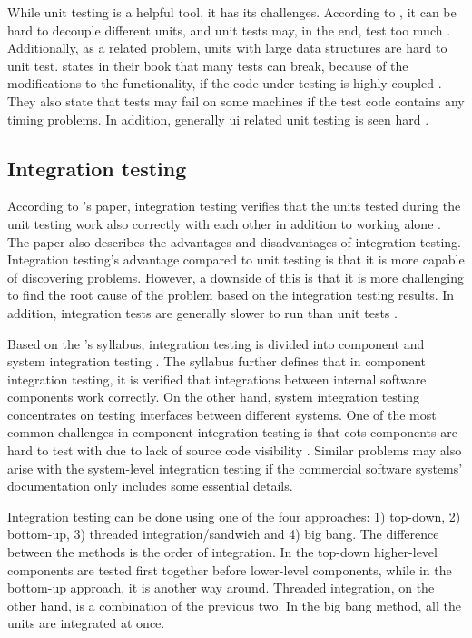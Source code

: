 While unit testing is a helpful tool, it has its challenges. According to \citeauthor{runeson2006survey}, it can be hard to decouple different units, and unit tests may, in the end, test too much \cite{runeson2006survey}. Additionally, as a related problem, units with large data structures are hard to unit test. \citeauthor{hunt2003pragmatic} states in their book that many tests can break, because of the modifications to the functionality, if the code under testing is highly coupled \cite{hunt2003pragmatic}. They also state that tests may fail on some machines if the test code contains any timing problems. In addition, generally \gls{ui} related unit testing is seen hard \cite{runeson2006survey}.

\subsection{Integration testing}\label{subsection:integration_testing}
According to \citeauthor{brar2015international}'s paper, integration testing verifies that the units tested during the unit testing work also correctly with each other in addition to working alone \cite{brar2015international}. The paper also describes the advantages and disadvantages of integration testing. Integration testing's advantage compared to unit testing is that it is more capable of discovering problems. However, a downside of this is that it is more challenging to find the root cause of the problem based on the integration testing results. In addition, integration tests are generally slower to run than unit tests \cite{simon2014mastering}.

Based on the \citeauthor{olsen2018istqbFoundation}'s syllabus, integration testing is divided into component and system integration testing \cite{olsen2018istqbFoundation}. The syllabus further defines that in component integration testing, it is verified that integrations between internal software components work correctly. On the other hand, system integration testing concentrates on testing interfaces between different systems. One of the most common challenges in component integration testing is that \gls{cots} components are hard to test with due to lack of source code visibility \cite{rehman2006software}. Similar problems may also arise with the system-level integration testing if the commercial software systems' documentation only includes some essential details.

Integration testing can be done using one of the four approaches: 1) top-down, 2) bottom-up, 3) threaded integration/sandwich and 4) big bang. The difference between the methods is the order of integration. In the top-down higher-level components are tested first together before lower-level components, while in the bottom-up approach, it is another way around. Threaded integration, on the other hand, is a combination of the previous two. In the big bang method, all the units are integrated at once. \cite{brar2015international, uma2013software, singh2012approach}


